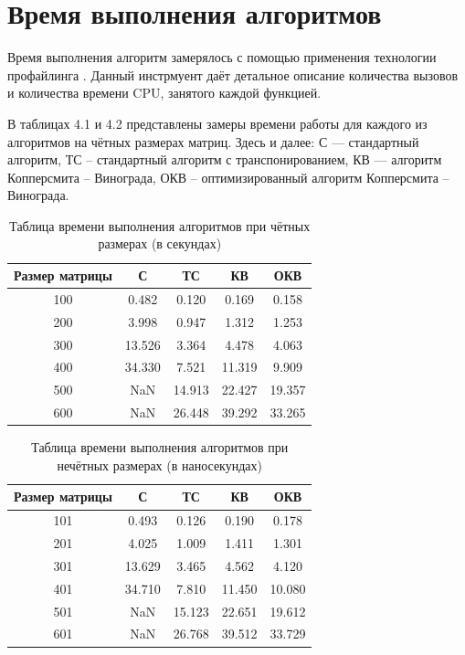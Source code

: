 \documentclass[12pt]{report}
\begin{document}
\section{Время выполнения алгоритмов}
Время выполнения алгоритм замерялось с помощью применения технологии профайлинга \cite{profiling}. Данный инстрмуент даёт детальное описание количества вызовов и количества времени CPU, занятого каждой функцией. \newline

В таблицах 4.1 и 4.2 представлены замеры времени работы для каждого из алгоритмов на чётных размерах матриц. Здесь и далее: С — стандартный алгоритм, ТС -- стандартный алгоритм с транспонированием, КВ — алгоритм Копперсмита -- Винограда, ОКВ -- оптимизированный алгоритм Копперсмита -- Винограда.

\begin{table} [h!]
	\caption{Таблица времени выполнения алгоритмов при чётных размерах (в секундах)}
	\begin{center}
		\begin{tabular}{|c c c c c|} 
		 	\hline
			Размер матрицы & С & ТС & КВ & ОКВ \\  
		 	\hline
		 	100 & 0.482 & 0.120 & 0.169 & 0.158 \\
		 	\hline
		 	200 & 3.998 & 0.947 & 1.312 & 1.253 \\
		 	\hline
			300 & 13.526 & 3.364 & 4.478 & 4.063 \\
			\hline
			400 & 34.330 & 7.521 & 11.319 & 9.909 \\
			\hline
			500 & NaN & 14.913 & 22.427 & 19.357 \\
			\hline
			600 & NaN & 26.448 & 39.292 & 33.265 \\
			\hline
		\end{tabular}
	\end{center}
\end{table}

\begin{table} [h!]
	\caption{Таблица времени выполнения алгоритмов при нечётных размерах (в наносекундах)}
	\begin{center}
	\begin{tabular}{|c c c c c|} 
		\hline
		Размер матрицы & С & ТС & КВ & ОКВ \\  
		\hline
		101 & 0.493 & 0.126 & 0.190 & 0.178 \\
		\hline
		201 & 4.025 & 1.009 & 1.411 & 1.301 \\
		\hline
		301 & 13.629 & 3.465 & 4.562 & 4.120 \\
		\hline
		401 & 34.710 & 7.810 & 11.450 & 10.080 \\
		\hline
		501 & NaN & 15.123 & 22.651 & 19.612 \\
		\hline
		601 & NaN & 26.768 & 39.512 & 33.729 \\
		\hline
	\end{tabular}
\end{center}
\end{table}
\end{document}
